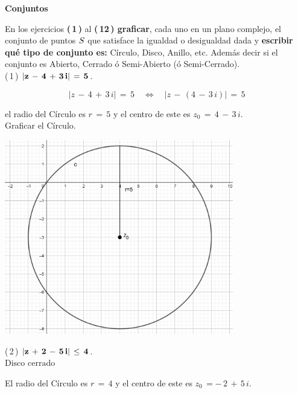 \documentclass[a4paper,11pt,openany]{book}
\begin{document}
\newpage


\graphicspath{ {images/} }

\begin{center}
\textbf{Conjuntos}
\end{center}

En los ejercicios \textbf{(\,1\,)} al \textbf{(\,12\,) graficar}, cada uno en un plano complejo, el conjunto de puntos $\mathnormal{S}$ que satisface la igualdad o desigualdad dada y \textbf{escribir qué tipo de conjunto es:} Círculo, Disco, Anillo, etc. Además decir si el conjunto es Abierto, Cerrado ó Semi-Abierto (ó Semi-Cerrado).\\

\textcolor{ao(english)}{(\,1\,)} $\bf{|z\,-\,4\,+\,3\,i|\,=\,5}$.

$$|z\,-\,4\,+\,3\,i|\,=\,5 \quad\iff\quad |z\,-\,(4\,-\,3\,i)|\,=\,5$$

el radio del Círculo es $r\,=\,5$ y el centro de este es $z_{0}\,=\,4\,-\,3\,i$.\\

\textcolor{ao(english)}{} Graficar el Círculo.

\begin{center}
     \includegraphics[width=10cm]{Gra-Ej-1.png}
\end{center}

\textcolor{ao(english)}{(\,2\,)} $\bf{|z\,+\,2\,-\,5\,i|\,\leq\,4}$.\\
$\text{Disco cerrado}$

El radio del Círculo es $r\,=\,4$ y el centro de este es $z_{0}\,=-\,2\,+\,5\,i$.\\
\end{document}
